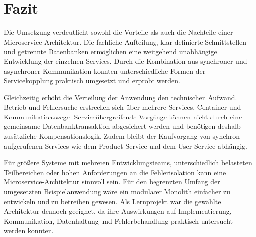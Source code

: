 \section{Fazit}

Die Umsetzung verdeutlicht sowohl die Vorteile als auch die Nachteile einer Microservice-Architektur.
Die fachliche Aufteilung, klar definierte Schnittstellen und
getrennte Datenbanken ermöglichen eine weitgehend unabhängige Entwicklung der einzelnen Services.
Durch die Kombination aus synchroner und asynchroner Kommunikation konnten unterschiedliche Formen der Servicekopplung praktisch umgesetzt und erprobt werden.

Gleichzeitig erhöht die Verteilung der Anwendung den technischen Aufwand.
Betrieb und Fehlersuche erstrecken sich über mehrere Services, Container und Kommunikationswege.
Serviceübergreifende Vorgänge können nicht durch eine gemeinsame Datenbanktransaktion abgesichert werden und
benötigen deshalb zusätzliche Kompensationslogik.
Zudem bleibt der Kaufvorgang von synchron aufgerufenen Services wie dem Product Service und dem User Service abhängig.

Für größere Systeme mit mehreren Entwicklungsteams,
unterschiedlich belasteten Teilbereichen oder
hohen Anforderungen an die Fehlerisolation kann eine Microservice-Architektur sinnvoll sein.
Für den begrenzten Umfang der umgesetzten Beispielanwendung wäre ein modularer Monolith einfacher zu entwickeln und
zu betreiben gewesen.
Als Lernprojekt war die gewählte Architektur dennoch geeignet, da ihre Auswirkungen auf Implementierung,
Kommunikation, Datenhaltung und Fehlerbehandlung praktisch untersucht werden konnten.